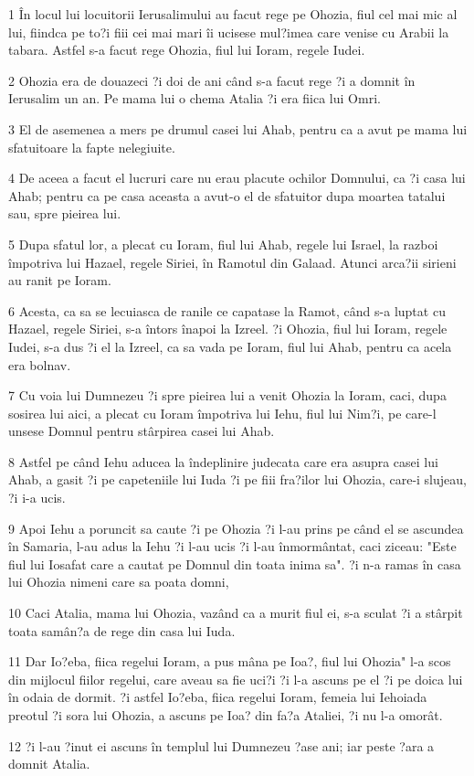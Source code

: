 \par 1 În locul lui locuitorii Ierusalimului au facut rege pe Ohozia, fiul cel mai mic al lui, fiindca pe to?i fiii cei mai mari îi ucisese mul?imea care venise cu Arabii la tabara. Astfel s-a facut rege Ohozia, fiul lui Ioram, regele Iudei.
\par 2 Ohozia era de douazeci ?i doi de ani când s-a facut rege ?i a domnit în Ierusalim un an. Pe mama lui o chema Atalia ?i era fiica lui Omri.
\par 3 El de asemenea a mers pe drumul casei lui Ahab, pentru ca a avut pe mama lui sfatuitoare la fapte nelegiuite.
\par 4 De aceea a facut el lucruri care nu erau placute ochilor Domnului, ca ?i casa lui Ahab; pentru ca pe casa aceasta a avut-o el de sfatuitor dupa moartea tatalui sau, spre pieirea lui.
\par 5 Dupa sfatul lor, a plecat cu Ioram, fiul lui Ahab, regele lui Israel, la razboi împotriva lui Hazael, regele Siriei, în Ramotul din Galaad. Atunci arca?ii sirieni au ranit pe Ioram.
\par 6 Acesta, ca sa se lecuiasca de ranile ce capatase la Ramot, când s-a luptat cu Hazael, regele Siriei, s-a întors înapoi la Izreel. ?i Ohozia, fiul lui Ioram, regele Iudei, s-a dus ?i el la Izreel, ca sa vada pe Ioram, fiul lui Ahab, pentru ca acela era bolnav.
\par 7 Cu voia lui Dumnezeu ?i spre pieirea lui a venit Ohozia la Ioram, caci, dupa sosirea lui aici, a plecat cu Ioram împotriva lui Iehu, fiul lui Nim?i, pe care-l unsese Domnul pentru stârpirea casei lui Ahab.
\par 8 Astfel pe când Iehu aducea la îndeplinire judecata care era asupra casei lui Ahab, a gasit ?i pe capeteniile lui Iuda ?i pe fiii fra?ilor lui Ohozia, care-i slujeau, ?i i-a ucis.
\par 9 Apoi Iehu a poruncit sa caute ?i pe Ohozia ?i l-au prins pe când el se ascundea în Samaria, l-au adus la Iehu ?i l-au ucis ?i l-au înmormântat, caci ziceau: "Este fiul lui Iosafat care a cautat pe Domnul din toata inima sa". ?i n-a ramas în casa lui Ohozia nimeni care sa poata domni,
\par 10 Caci Atalia, mama lui Ohozia, vazând ca a murit fiul ei, s-a sculat ?i a stârpit toata samân?a de rege din casa lui Iuda.
\par 11 Dar Io?eba, fiica regelui Ioram, a pus mâna pe Ioa?, fiul lui Ohozia" l-a scos din mijlocul fiilor regelui, care aveau sa fie uci?i ?i l-a ascuns pe el ?i pe doica lui în odaia de dormit. ?i astfel Io?eba, fiica regelui Ioram, femeia lui Iehoiada preotul ?i sora lui Ohozia, a ascuns pe Ioa? din fa?a Ataliei, ?i nu l-a omorât.
\par 12 ?i l-au ?inut ei ascuns în templul lui Dumnezeu ?ase ani; iar peste ?ara a domnit Atalia.

